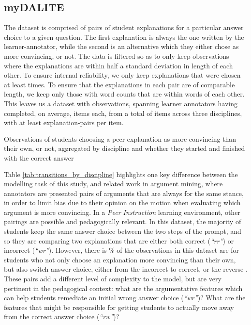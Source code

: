 \documentclass[runningheads]{llncs}
\begin{document}
\subsection{myDALITE}
The dataset is comprised of pairs of student explanations for a particular 
answer choice to a given question. The first explanation is always the one 
written by the learner-annotator, while the second is an alternative which 
they either chose as more convincing, or not. The data is filtered so as 
to only keep observations where the explanations are within half a standard 
deviation in length of each other. To ensure internal reliability, we only keep 
explanations that were chosen at least times. To ensure 
that the explanations in each pair 
are of comparable length, we keep only those with word counts that are within  
words of each other. This leaves us a dataset 
with observations, spanning learner 
annotators having completed, on average, items 
each, from a total of items across three disciplines, 
with at least explanation-pairs per item.
\begin{table}
	\caption{Observations of students choosing a peer explanation as 
		more 
		convincing than their own, or not, aggregated by discipline and whether 
		they 
		started and finished with the correct answer}
	
	
	
	\label{tab:transitions_by_discipline}
\end{table}

Table \ref{tab:transitions_by_discipline} highlights one key difference between 
the modelling task of this study, and related work in argument mining, where 
annotators are presented pairs of arguments that are always for the same 
stance, in order to limit bias due to their opinion on the motion when 
evaluating which argument is more convincing.
In a \textit{Peer Instruction} learning environment, other pairings are 
possible and pedagogically relevant. In this dataset, the majority of students 
keep the same answer choice between the two steps of the prompt, and so they 
are comparing two explanations that are either both correct (\textit{``rr''}) 
or incorrect (\textit{``wr''}). However, there is 
\% of the observations in this dataset are for students 
who not only choose an explanation more convincing than their own, but also 
switch answer choice, 
either from the incorrect to correct, or the reverse . These pairs add a 
different level of complexity to the model, but are very pertinent in the 
pedagogical context: what are the argumentative features which can help 
students remediate an initial wrong answer choice (\textit{``wr''})? What are 
the features that might be responsible for getting students to actually move 
away from the correct answer choice (\textit{``rw''})?
\end{document}
